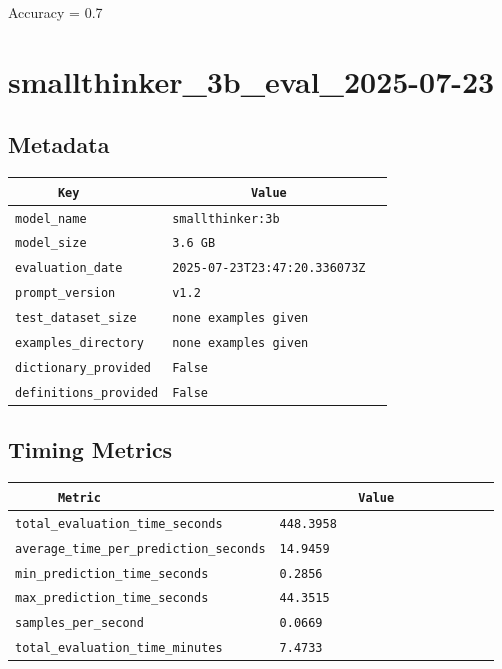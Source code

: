 \documentclass{article}
\begin{document}
\begin{center}
Accuracy = 0.7
\end{center}

\section{smallthinker\_3b\_eval\_2025-07-23}
\subsection{Metadata}

\begin{center}
\begin{tabular}{l | l} \hline
    \verb|      Key      | & \verb|           Value           | \\ \hline
    \hline
    \verb|model_name    | & \verb|smallthinker:3b              | \\ \hline
    \verb|model_size    | & \verb|3.6 GB                       | \\ \hline
    \verb|evaluation_date| & \verb|2025-07-23T23:47:20.336073Z  | \\ \hline
    \verb|prompt_version| & \verb|v1.2                         | \\ \hline
    \verb|test_dataset_size| & \verb|none examples given          | \\ \hline
    \verb|examples_directory| & \verb|none examples given          | \\ \hline
    \verb|dictionary_provided| & \verb|False                        | \\ \hline
    \verb|definitions_provided| & \verb|False                        | \\ \hline
\end{tabular}
\end{center}

\subsection{Timing Metrics}

\begin{center}
\begin{tabular}{l | l} \hline
    \verb|      Metric     | & \verb|           Value           | \\ \hline
    \hline
    \verb|total_evaluation_time_seconds| & \verb|448.3958                     | \\ \hline
    \verb|average_time_per_prediction_seconds| & \verb|14.9459                      | \\ \hline
    \verb|min_prediction_time_seconds| & \verb|0.2856                       | \\ \hline
    \verb|max_prediction_time_seconds| & \verb|44.3515                      | \\ \hline
    \verb|samples_per_second| & \verb|0.0669                       | \\ \hline
    \verb|total_evaluation_time_minutes| & \verb|7.4733                       | \\ \hline
\end{tabular}
\end{center}
\end{document}
